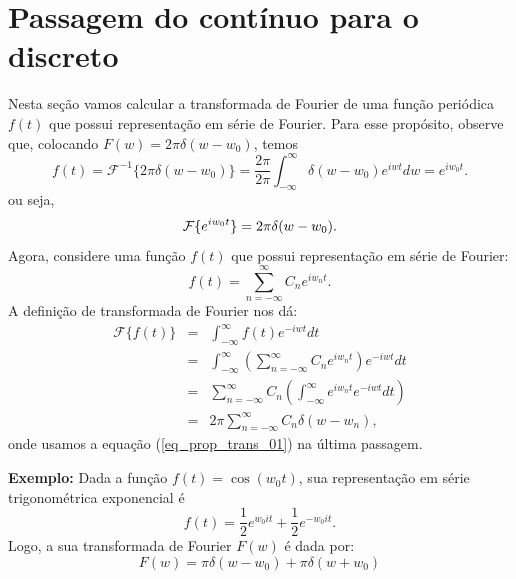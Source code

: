 \documentclass[a4paper,10pt]{book}
\begin{document}
\section{Passagem do contínuo para o discreto}
Nesta seção vamos calcular a transformada de Fourier de uma função periódica $f(t)$ que possui representação em série de Fourier. Para esse propósito, observe que, colocando $F(w)=2\pi \delta(w-w_0)$, temos 
\begin{equation*}
f(t)=\mathcal{F}^{-1}\{2\pi\delta(w-w_0)\}=\frac{2\pi}{2\pi}\int_{-\infty}^\infty \delta(w-w_0)e^{iwt}dw=e^{iw_0t}.
\end{equation*}
ou seja,
\begin{equation}{\label{eq_prop_trans_01}}
\mathcal{F}\{e^{iw_0t}\}=2\pi\delta(w-w_0).
\end{equation}
Agora, considere uma função $f(t)$ que possui representação em série de Fourier:
\begin{equation}
f(t)=\sum_{n=-\infty}^\infty C_n e^{iw_nt}.
\end{equation}
A definição de transformada de Fourier nos dá:
\begin{eqnarray*}
\mathcal{F}\{f(t)\}&=&\int_{-\infty}^\infty f(t) e^{-iwt}dt\\
&=&\int_{-\infty}^\infty\left( \sum_{n=-\infty}^\infty C_n e^{iw_nt}\right) e^{-iwt}dt\\
&=& \sum_{n=-\infty}^\infty C_n \left(\int_{-\infty}^\infty e^{iw_nt}e^{-iwt} dt \right)\\
&=&2\pi \sum_{n=-\infty}^\infty C_n \delta(w-w_n) ,
\end{eqnarray*}
onde usamos a equação (\ref{eq_prop_trans_01}) na última passagem.

{\bf Exemplo:} Dada a função $f(t)=\cos(w_0t)$, sua representação em série trigonométrica exponencial é
 \begin{equation}
 f(t)=\frac{1}{2}e^{w_0it}+\frac{1}{2}e^{-w_0it}.
 \end{equation}
 Logo, a sua transformada de Fourier $F(w)$ é dada por:
 \begin{equation}
 F(w)=\pi\delta(w-w_0)+\pi\delta(w+w_0)
 \end{equation}
\end{document}
